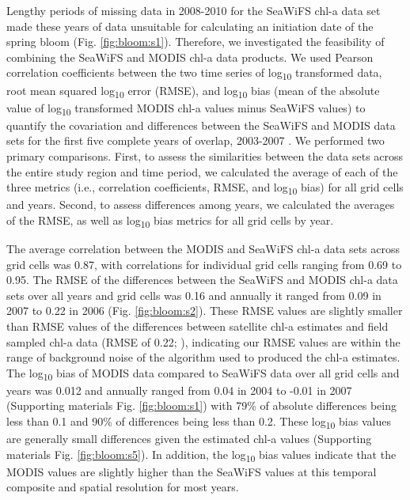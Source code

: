 Lengthy periods of missing data in 2008-2010 for the SeaWiFS chl-a data set made
these years of data unsuitable for calculating an initiation date of the spring
bloom (Fig. \ref{fig:bloom:s1}). Therefore, we investigated the feasibility of
combining the SeaWiFS and MODIS chl-a data products. We used Pearson correlation
coefficients between the two time series of log\textsubscript{10} transformed
data, root mean squared log\textsubscript{10} error (RMSE), and
log\textsubscript{10} bias (mean of the absolute value of log\textsubscript{10}
transformed MODIS chl-a values minus SeaWiFS values) to quantify the covariation
and differences between the SeaWiFS and MODIS data sets for the first five
complete years of overlap, 2003-2007 \citep{Gregg2004, OReilly2000a, Zhang2006}
. We performed two primary comparisons. First, to assess the similarities
between the data sets across the entire study region and time period, we
calculated the average of each of the three metrics (i.e., correlation
coefficients, RMSE, and log\textsubscript{10} bias) for all grid cells and
years. Second, to assess differences among years, we calculated the averages of
the RMSE, as well as log\textsubscript{10} bias metrics for all grid cells by
year.

The average correlation between the MODIS and SeaWiFS chl-a data sets across
grid cells was 0.87, with correlations for individual grid cells ranging from
0.69 to 0.95. The RMSE of the differences between the SeaWiFS and MODIS chl-a
data sets over all years and grid cells was 0.16 and annually it ranged from
0.09 in 2007 to 0.22 in 2006 (Fig.  \ref{fig:bloom:s2}).  These RMSE values are
slightly smaller than RMSE values of the differences between satellite chl-a
estimates and field sampled chl-a data (RMSE of 0.22; \citep{OReilly2000a}),
indicating our RMSE values are within the range of background noise of the
algorithm used to produced the chl-a estimates. The log\textsubscript{10} bias
of MODIS data compared to SeaWiFS data over all grid cells and years was 0.012
and annually ranged from 0.04 in 2004 to -0.01 in 2007 (Supporting materials
Fig. \ref{fig:bloom:s1}) with 79\% of absolute differences being less than 0.1
and 90\% of differences being less than 0.2. These log\textsubscript{10} bias
values are generally small differences given the estimated chl-a values
(Supporting materials Fig.  \ref{fig:bloom:s5}).  In addition, the
log\textsubscript{10} bias values indicate that the MODIS values are slightly
higher than the SeaWiFS values at this temporal composite and spatial resolution
for most years.


